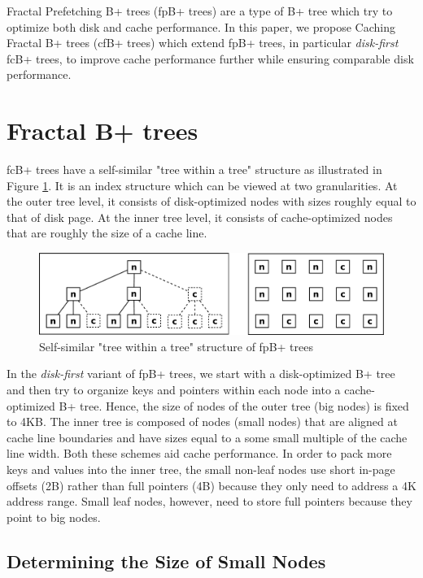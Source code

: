 \documentclass{article}
\begin{document}
Fractal Prefetching B+ trees (fpB+ trees) are a type of B+ tree which try to optimize both disk and cache performance. In this paper, we propose Caching Fractal B+ trees (cfB+ trees) which extend fpB+ trees, in particular \textit{disk-first} fcB+ trees, to improve cache performance further while ensuring comparable disk performance.

\section{Fractal B+ trees}

fcB+ trees have a self-similar "tree within a tree" structure as illustrated in Figure \ref{fig:inner_block}. It is an index structure which can be viewed at two granularities. At the outer tree level, it consists of disk-optimized nodes with sizes roughly equal to that of disk page. At the inner tree level, it consists of cache-optimized nodes that are roughly the size of a cache line.

\begin{figure}[h]
\begin{center}
\includegraphics[width=350pt]{inner_block}
\end{center}
\caption{
Self-similar "tree within a tree" structure of fpB+ trees
}
\label{fig:inner_block}
\end{figure}

In the \textit{disk-first} variant of fpB+ trees, we start with a disk-optimized B+ tree and then try to organize keys and pointers within each node into a cache-optimized B+ tree. Hence, the size of nodes of the outer tree (big nodes) is fixed to 4KB. The inner tree is composed of nodes (small nodes) that are aligned at cache line boundaries and have sizes equal to a some small multiple of the cache line width. Both these schemes aid cache performance. In order to pack more keys and values into the inner tree, the small non-leaf nodes use short in-page offsets (2B) rather than full pointers (4B) because they only need to address a 4K address range. Small leaf nodes, however, need to store full pointers because they point to big nodes.

\subsection{Determining the Size of Small Nodes}
\end{document}
